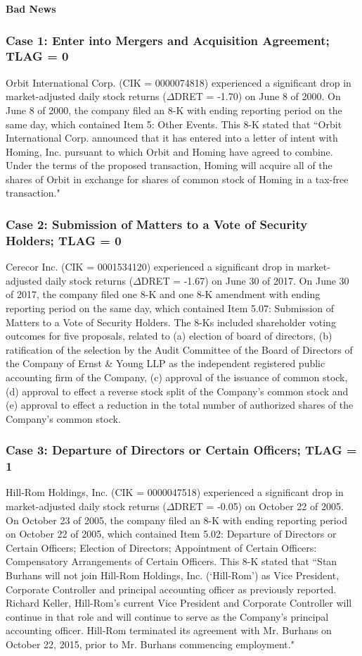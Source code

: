 \begin{center}
	\textbf{Bad News}
\end{center}
\subsubsection*{Case 1: Enter into Mergers and Acquisition Agreement; TLAG = 0}
Orbit International Corp. (CIK = 0000074818) experienced a significant drop in market-adjusted daily stock returns ($\Delta$DRET = -1.70) on June 8 of 2000. On June 8 of 2000, the company filed an 8-K with ending reporting period on the same day, which contained Item 5: Other Events. This 8-K stated that ``Orbit International Corp. announced that it has entered into a letter of intent with Homing, Inc. pursuant to which Orbit and Homing have agreed to combine. Under the terms of the proposed transaction, Homing will acquire all of the shares of Orbit in exchange for shares of common stock of Homing in a tax-free transaction."
\subsubsection*{Case 2: Submission of Matters to a Vote of Security Holders; TLAG = 0}
Cerecor Inc. (CIK = 0001534120) experienced a significant drop in market-adjusted daily stock returns ($\Delta$DRET = -1.67) on June 30 of 2017. On June 30 of 2017, the company filed one 8-K and one 8-K amendment with ending reporting period on the same day, which contained Item 5.07: Submission of Matters to a Vote of Security Holders. The 8-Ks included shareholder voting outcomes for five proposals, related to (a) election of board of directors, (b) ratification of the selection by the Audit Committee of the Board of Directors of the Company of Ernst \& Young LLP as the independent registered public accounting firm of the Company, (c) approval of the issuance of common stock, (d) approval to effect a reverse stock split of the Company’s common stock and (e) approval to effect a reduction in the total number of authorized shares of the Company’s common stock.
\subsubsection*{Case 3: Departure of Directors or Certain Officers; TLAG = 1}
Hill-Rom Holdings, Inc. (CIK = 0000047518) experienced a significant drop in market-adjusted daily stock returns ($\Delta$DRET = -0.05) on October 22 of 2005. On October 23 of 2005, the company filed an 8-K with ending reporting period on October 22 of 2005, which contained Item 5.02: Departure of Directors or Certain Officers; Election of Directors; Appointment of Certain Officers: Compensatory Arrangements of Certain Officers. This 8-K stated that ``Stan Burhans will not join Hill-Rom Holdings, Inc. (`Hill-Rom') as Vice President, Corporate Controller and principal accounting officer as previously reported. Richard Keller, Hill-Rom’s current Vice President and Corporate Controller will continue in that role and will continue to serve as the Company’s principal accounting officer. Hill-Rom terminated its agreement with Mr. Burhans on October 22, 2015, prior to Mr. Burhans commencing employment." 
